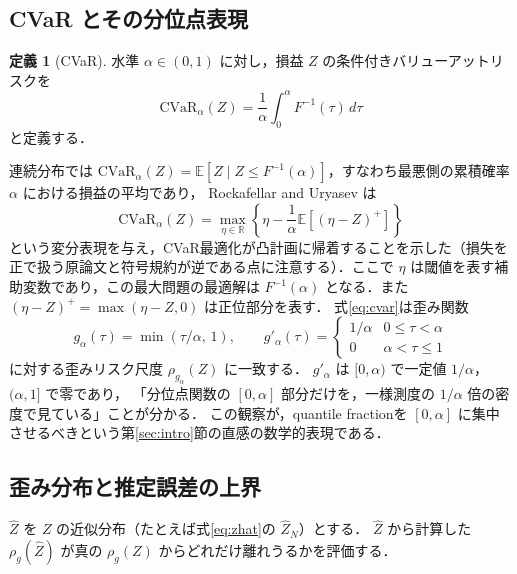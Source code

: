 \documentclass[a4paper,10pt]{jsarticle}
\theoremstyle{definition}
\newtheorem{definition}{定義}[section]
\newcommand{\CVaR}{\mathrm{CVaR}}
\newcommand{\Finv}{F^{-1}}
\newcommand{\R}{\mathbb{R}}
\newcommand{\E}{\mathbb{E}}
\begin{document}
\subsection{CVaR とその分位点表現}
\label{subsec:cvar}
\begin{definition}[CVaR]
水準 $\alpha\in(0,1)$ に対し，損益 $Z$ の条件付きバリューアットリスクを
\begin{equation}
  \CVaR_\alpha(Z)=\frac1\alpha\int_0^\alpha\Finv(\tau)\,d\tau
  \label{eq:cvar}
\end{equation}
と定義する．
\end{definition}
連続分布では $\CVaR_\alpha(Z)=\E[Z\mid Z\le\Finv(\alpha)]$，すなわち最悪側の累積確率 $\alpha$ における損益の平均であり，
Rockafellar and Uryasev \cite{rockafellar2000cvar} は
\begin{equation}
  \CVaR_\alpha(Z)=\max_{\eta\in\R}\left\{\eta-\frac1\alpha\E\left[(\eta-Z)^+\right]\right\}
\end{equation}
という変分表現を与え，CVaR最適化が凸計画に帰着することを示した（損失を正で扱う原論文と符号規約が逆である点に注意する）．ここで $\eta$ は閾値を表す補助変数であり，この最大問題の最適解は $\Finv(\alpha)$ となる．また $(\eta-Z)^+=\max(\eta-Z,0)$ は正位部分を表す．
式\eqref{eq:cvar}は歪み関数
\begin{equation}
  g_\alpha(\tau)=\min\left(\tau/\alpha,\,1\right),\qquad
  g'_\alpha(\tau)=\begin{cases}1/\alpha & 0\le\tau<\alpha\\ 0 & \alpha<\tau\le 1\end{cases}
  \label{eq:g-cvar}
\end{equation}
に対する歪みリスク尺度 $\rho_{g_\alpha}(Z)$ に一致する．
$g'_\alpha$ は $[0,\alpha)$ で一定値 $1/\alpha$，$(\alpha,1]$ で零であり，
「分位点関数の $[0,\alpha]$ 部分だけを，一様測度の $1/\alpha$ 倍の密度で見ている」ことが分かる．
この観察が，quantile fractionを $[0,\alpha]$ に集中させるべきという第\ref{sec:intro}節の直感の数学的表現である．

\subsection{歪み分布と推定誤差の上界}
\label{subsec:bound}
$\hat Z$ を $Z$ の近似分布（たとえば式\eqref{eq:zhat}の $\hat Z_N$）とする．
$\hat Z$ から計算した $\rho_g(\hat Z)$ が真の $\rho_g(Z)$ からどれだけ離れうるかを評価する．
\end{document}
